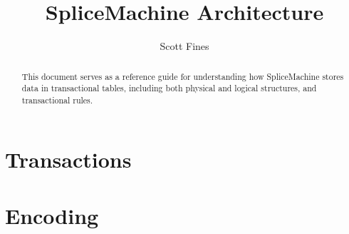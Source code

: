 \documentclass[10pt]{amsbook}
\begin{document}
\title{SpliceMachine Architecture}
\author{Scott Fines}

\begin{abstract}
This document serves as a reference guide for understanding how SpliceMachine stores data in transactional tables, including both physical and logical structures, and transactional rules.
\end{abstract}

\chapter{Transactions}

\chapter{Encoding}



\end{document}
